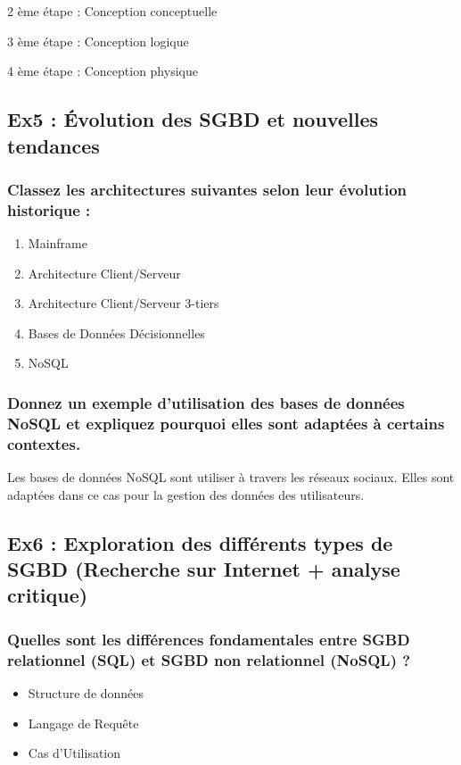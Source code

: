 \documentclass{article}
\begin{document}
2 ème étape : Conception conceptuelle   %

3 ème étape : Conception logique        %
 
4 ème étape : Conception physique       %

\subsection{Ex5 : Évolution des SGBD et nouvelles tendances}
\subsubsection{Classez les architectures suivantes selon leur évolution historique :}
\begin{enumerate}
  \item Mainframe  
  \item Architecture Client/Serveur  
  \item Architecture Client/Serveur 3-tiers  
  \item Bases de Données Décisionnelles 
  \item NoSQL 
\end{enumerate}

\subsubsection{Donnez un exemple d’utilisation des bases de données NoSQL et expliquez pourquoi elles sont adaptées à certains contextes.}
Les bases de données NoSQL sont utiliser à travers les réseaux sociaux. Elles sont adaptées dans ce 
cas pour la gestion des données des utilisateurs.  

\subsection{Ex6 : Exploration des différents types de SGBD (Recherche sur Internet + analyse critique)}
\subsubsection{Quelles sont les différences fondamentales entre SGBD relationnel (SQL) et SGBD non 
relationnel (NoSQL) ?}
 
\begin{itemize}
  \item Structure de données  
  \item Langage de Requête 
  \item Cas d’Utilisation 
\end{itemize}
\end{document}
